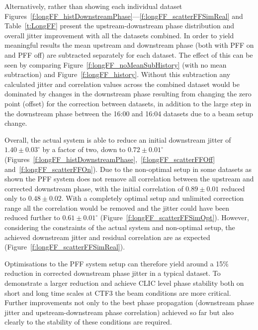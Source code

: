Alternatively, rather than showing each individual dataset Figures~\ref{f:longFF_histDownstreamPhase}---\ref{f:longFF_scatterFFSimReal} and Table~\ref{t:LongFF} present the upstream-downstream phase distribution and overall jitter improvement with all the datasets combined. In order to yield meaningful results the mean upstream and downstream phase (both with PFF on and PFF off) are subtracted separately for each dataset. The effect of this can be seen by comparing Figure~\ref{f:longFF_noMeanSubHistory} (with no mean subtraction) and Figure~\ref{f:longFF_history}. Without this subtraction any calculated jitter and correlation values across the combined dataset would be dominated by changes in the downstream phase resulting from changing the zero point (offset) for the correction between datasets, in addition to the large step in the downstream phase between the 16:00 and 16:04 datasets due to a beam setup change.

Overall, the actual system is able to reduce an initial downstream jitter of \(1.40\pm0.03^\circ\) by a factor of two, down to \(0.72\pm0.01^\circ\) (Figures~\ref{f:longFF_histDownstreamPhase},~\ref{f:longFF_scatterFFOff} and~\ref{f:longFF_scatterFFOn}). Due to the non-optimal setup in some datasets as shown the PFF system does not remove all correlation between the upstream and corrected downstream phase, with the initial correlation of \(0.89\pm0.01\) reduced only to \(0.48\pm0.02\). With a completely optimal setup and unlimited correction range all the correlation would be removed and the jitter could have been reduced further to \(0.61\pm0.01^\circ\) (Figure~\ref{f:longFF_scatterFFSimOpt}). However, considering the constraints of the actual system and non-optimal setup, the achieved downstream jitter and residual correlation are as expected (Figure~\ref{f:longFF_scatterFFSimReal}).

Optimisations to the PFF system setup can therefore yield around a 15\% reduction in corrected downstream phase jitter in a typical dataset. To demonstrate a larger reduction and achieve CLIC level phase stability both on short and long time scales at CTF3 the beam conditions are more critical. Further improvements not only to the best phase propagation (downstream phase jitter and upstream-downstream phase correlation) achieved so far but also clearly to the stability of these conditions are required.

